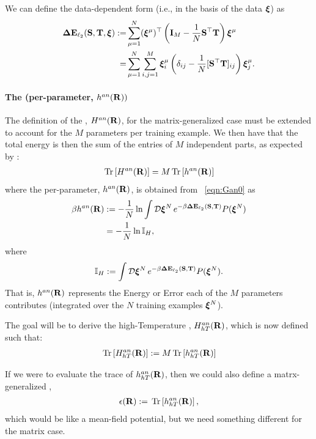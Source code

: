 We can define the data-dependent form (i.e., in the basis of the data $\boldsymbol{\xi}$) as
\begin{align}
\nonumber
\mathbf{\Delta {E}}_{\ell_2}({\mathbf{S}},{\mathbf{T}}, \boldsymbol{\xi})
   :=& \sum_{\mu=1}^{N} (\boldsymbol{\xi}^{\mu})^{\top} \left( \mathbf{I}_{M} - \frac{1}{N} {\mathbf{S}}^{\top}{\mathbf{T}} \right) \boldsymbol{\xi}^{\mu} \\
\label{eqn:DETOPNN}
    =&  \sum_{\mu=1}^{N} \sum_{i,j=1}^{M} \boldsymbol{\xi}_i^{\mu} \left( \delta_{ij} - \frac{1}{N} [{\mathbf{S}}^{\top}{\mathbf{T}}]_{ij} \right) \boldsymbol{\xi}_j^{\mu}  .
\end{align}

\paragraph{The \AnnealedHamiltonian (per-parameter, $h^{an}(\mathbf{R}))$}
The definition of the \AnnealedHamiltonian, $H^{an}(\mathbf{R})$, for the matrix-generalized case must be extended to account for the $M$ parameters per training example.  We then have that the total energy is then the sum of the entries of $M$ independent parts, as expected by \SizeConsistency:
\begin{align}
 \label{eqn:hanpp}
 \mbox{}\operatorname{Tr}\left[H^{an}(\mathbf{R})\right]=M\mbox{}\operatorname{Tr}\left[h^{an}(\mathbf{R})\right]
\end{align}
where the \AnnealedHamiltonian per-parameter, $h^{an}(\mathbf{R})$, is obtained from \EQN~\ref{eqn:Gan0} as
\begin{align}
\label{eqn:Gan_lnI}
\beta h^{an}(\mathbf{R})
   &:=-\frac{1}{N}\ln   \int\mathcal{D}\boldsymbol{\xi}^{N} \, e^{-\beta \mathbf{\Delta {E}}_{\ell_2}({\mathbf{S}},{\mathbf{T}})} P(\boldsymbol{\xi}^{N}) \\
\nonumber
   &=-\frac{1}{N}\ln \mathbb{I}_{H} ,
\end{align}
where
\begin{align}
\label{eqn:InsideGan}
\mathbb{I}_{H} := \int\mathcal{D}\boldsymbol{\xi}^{N} \, e^{-\beta \mathbf{\Delta {E}}_{\ell_2}({\mathbf{S}},{\mathbf{T}})} P(\boldsymbol{\xi}^{N}) .
\end{align}
That is, $h^{an}(\mathbf{R})$ represents the Energy or Error each of the $M$ parameters contributes
(integrated over the $N$ training examples $\boldsymbol{\xi}^{N}$).

The goal will be to derive the high-Temperature \AnnealedHamiltonian, $H^{an}_{hT}(\mathbf{R})$, which is now  defined such that:
\begin{align}
 \label{eqn:hanpp}
  \mbox{}\operatorname{Tr}\left[H^{an}_{hT}(\mathbf{R})\right]:=M\mbox{}\operatorname{Tr}\left[h^{an}_{hT}(\mathbf{R})  \right]
\end{align}

If we were to evaluate the trace of $h^{an}_{hT}(\mathbf{R})$, then we could also define
a matrx-generalized \EffectivePotential,
\begin{align}
  \label{eqn:EPSL_mat}
  \epsilon(\mathbf{R}):=\mbox{}\operatorname{Tr}\left[h^{an}_{hT}(\mathbf{R})\right],
\end{align}
which would be like a mean-field potential, but we need something different for the matrix case.

